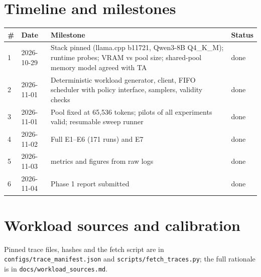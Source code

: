 \documentclass[10pt]{article}
\begin{document}
\clearpage
\appendix
\section{Timeline and milestones}
{\small
\begin{tabularx}{\linewidth}{@{}llXl@{}}
\toprule
\# & Date & Milestone & Status \\
\midrule
1 & 2026-10-29 & Stack pinned (llama.cpp b11721, Qwen3-8B Q4\_K\_M); runtime probes; VRAM vs pool size; shared-pool memory model agreed with TA & done \\
2 & 2026-11-01 & Deterministic workload generator, client, FIFO scheduler with policy interface, samplers, validity checks & done \\
3 & 2026-11-01 & Pool fixed at 65,536 tokens; pilots of all experiments valid; resumable sweep runner & done \\
4 & 2026-11-02 & Full E1--E6 (171 runs) and E7 & done \\
5 & 2026-11-03 & metrics and figures from raw logs & done \\
6 & 2026-11-04 & Phase 1 report submitted & done \\
\bottomrule
\end{tabularx}}

\section{Workload sources and calibration}\label{app:sources}
Pinned trace files, hashes and the fetch script are in \texttt{configs/trace\_manifest.json} and
\texttt{scripts/fetch\_traces.py}; the full rationale is in \texttt{docs/workload\_sources.md}.
\end{document}
